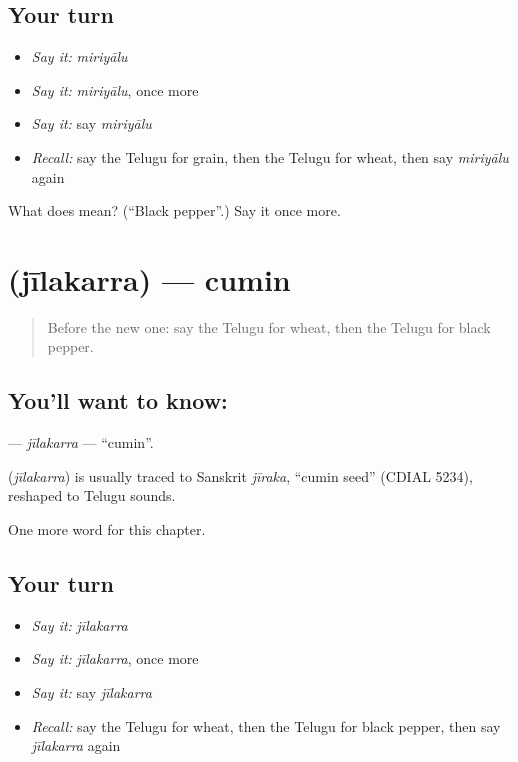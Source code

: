 \subsection*{Your turn}
\begin{itemize}
\raggedright
  \item \emph{Say it:} \emph{miriyālu}
  \item \emph{Say it:} \emph{miriyālu}, once more
  \item \emph{Say it:} say \emph{miriyālu}
  \item \emph{Recall:} say the Telugu for grain, then the Telugu for wheat, then say \emph{miriyālu} again
\end{itemize}

\begin{tcolorbox}[breakable,colback=teal!4,colframe=teal!35!black,title={Before you move on}]
What does  mean? (\textquotedblleft{}Black pepper\textquotedblright{}.) Say it once more.
\end{tcolorbox}
\section[\texorpdfstring{\te{జీలకర్ర} (jīlakarra)}{జీలకర్ర (jīlakarra)}]{ (jīlakarra) — cumin}

\label{lesson:TE-C135-jilakarra}



\begin{quote}
Before the new one: say the Telugu for wheat, then the Telugu for black pepper.
\end{quote}

\subsection*{You'll want to know: }
\textbf{} — \emph{jīlakarra} — \textquotedblleft{}cumin\textquotedblright{}.

\begin{cousinweb}
\textbf{} (\emph{jīlakarra}) is usually traced to Sanskrit \emph{jīraka}, \textquotedblleft{}cumin seed\textquotedblright{} (CDIAL 5234), reshaped to Telugu sounds.
\end{cousinweb}

\begin{grammarlens}[title={What you've built}]
One more word for this chapter.
\end{grammarlens}

\subsection*{Your turn}
\begin{itemize}
\raggedright
  \item \emph{Say it:} \emph{jīlakarra}
  \item \emph{Say it:} \emph{jīlakarra}, once more
  \item \emph{Say it:} say \emph{jīlakarra}
  \item \emph{Recall:} say the Telugu for wheat, then the Telugu for black pepper, then say \emph{jīlakarra} again
\end{itemize}

